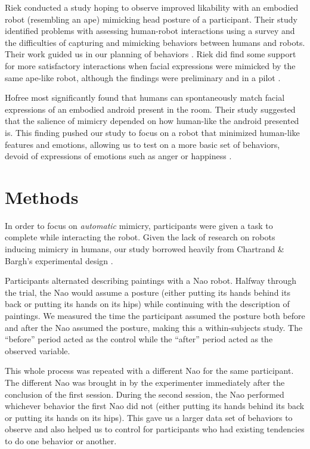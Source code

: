 \documentclass{acm_proc_article-sp}
\begin{document}
Riek conducted a study hoping to observe improved likability with an embodied robot (resembling an ape) mimicking head posture of a participant. Their study identified problems with assessing human-robot interactions using a survey and the difficulties of capturing and mimicking behaviors between humans and robots. Their work guided us in our planning of behaviors \cite{riek2010my}. Riek did find some support for more satisfactory interactions when facial expressions were mimicked by the same ape-like robot, although the findings were preliminary and in a pilot \cite{riek2008real}.

Hofree most significantly found that humans can spontaneously match facial expressions of an embodied android present in the room. Their study suggested that the salience of mimicry depended on how human-like the android presented is. This finding pushed our study to focus on a robot that minimized human-like features and emotions, allowing us to test on a more basic set of behaviors, devoid of expressions of emotions such as anger or happiness \cite{hofree2014bridging}. 

\section{Methods} 
In order to focus on \textit{automatic} mimicry, participants were given a task to complete while interacting the robot. Given the lack of research on robots inducing mimicry in humans, our study borrowed heavily from Chartrand \& Bargh's experimental design \cite{chartrand1999chameleon}. 

Participants alternated describing paintings with a Nao robot. Halfway through the trial, the Nao would assume a posture (either putting its hands behind its back or putting its hands on its hips) while continuing with the description of paintings. We measured the time the participant assumed the posture both before and after the Nao assumed the posture, making this a within-subjects study. The ``before'' period acted as the control while the ``after'' period acted as the observed variable.

This whole process was repeated with a different Nao for the same participant. The different Nao was brought in by the experimenter immediately after the conclusion of the first session. During the second session, the Nao performed whichever behavior the first Nao did not (either putting its hands behind its back or putting its hands on its hips). This gave us a larger data set of behaviors to observe and also helped us to control for participants who had existing tendencies to do one behavior or another.
\end{document}
